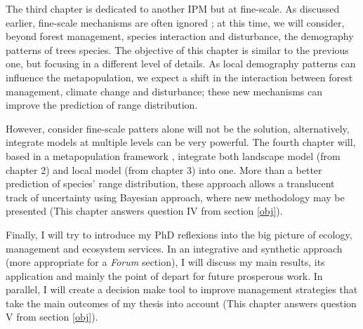 The third chapter is dedicated to another IPM but at fine-scale.
As discussed earlier, fine-scale mechanisms are often ignored \parencite{Hylander2013}; at this time, we will consider, beyond forest management, species interaction and disturbance, the demography patterns of trees species.
The objective of this chapter is similar to the previous one, but focusing in a different level of details.
As local demography patterns can influence the metapopulation, we expect a shift in the interaction between forest management, climate change and disturbance; these new mechanisms can improve the prediction of range distribution.

However, consider fine-scale patters alone will not be the solution, alternatively, integrate models at multiple levels can be very powerful. The fourth chapter will, based in a metapopulation framework \parencite{Talluto2016a}, integrate both landscape model (from chapter 2) and local model (from chapter 3) into one.
More than a better prediction of species' range distribution, these approach allows a translucent track of uncertainty using Bayesian approach, where new methodology may be presented (This chapter answers question IV from section \ref{obj}).

Finally, I will try to introduce my PhD reflexions into the big picture of ecology, management and ecosystem services. In an integrative and synthetic approach (more appropriate for a \textit{Forum} section), I will discuss my main results, its application and mainly the point of depart for future prosperous work.
In parallel, I will create a decision make tool to improve management strategies that take the main outcomes of my thesis into account (This chapter answers question V from section \ref{obj}).

\printbibliography


